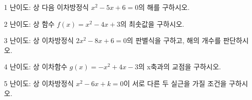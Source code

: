 \documentclass[fleqn]{article}
\begin{document}
   
1 난이도: 상 다음 이차방정식 \(x^2 - 5x + 6 = 0\)의 해를 구하시오.

2 난이도: 상 함수 \(f(x) = x^2 - 4x + 3\)의 최솟값을 구하시오.

3 난이도: 상 이차방정식 \(2x^2 - 8x + 6 = 0\)의 판별식을 구하고, 해의
개수를 판단하시오.

4 난이도: 상 이차함수 \(g(x) = -x^2 + 4x - 3\)의 x축과의 교점을
구하시오.

5 난이도: 상 이차방정식 \(x^2 - 6x + k = 0\)이 서로 다른 두 실근을 가질
조건을 구하시오.
\end{document}
